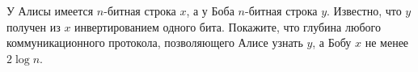 У Алисы имеется $n$-битная строка $x$, а у Боба $n$-битная строка $y$. Известно, что $y$ получен из $x$
инвертированием одного бита. Покажите, что глубина любого коммуникационного протокола, позволяющего Алисе
узнать $y$, а Бобу $x$ не менее $2 \log n$.